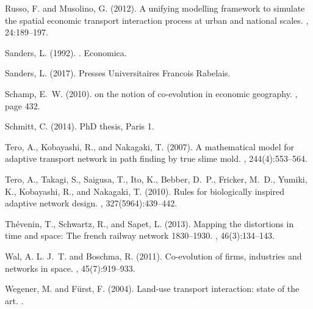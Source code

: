 \documentclass[11pt]{article}
\begin{document}
\begin{thebibliography}{}
Russo, F. and Musolino, G. (2012).
\newblock A unifying modelling framework to simulate the spatial economic
  transport interaction process at urban and national scales.
, 24:189--197.

Sanders, L. (1992).
.
\newblock Economica.

Sanders, L. (2017).
\newblock Presses Universitaires Francois Rabelais.

Schamp, E.~W. (2010).
 on the notion of co-evolution in economic geography.
, page 432.

Schmitt, C. (2014).
\newblock PhD thesis, Paris 1.

Tero, A., Kobayashi, R., and Nakagaki, T. (2007).
\newblock A mathematical model for adaptive transport network in path finding
  by true slime mold.
, 244(4):553--564.

Tero, A., Takagi, S., Saigusa, T., Ito, K., Bebber, D.~P., Fricker, M.~D.,
  Yumiki, K., Kobayashi, R., and Nakagaki, T. (2010).
\newblock Rules for biologically inspired adaptive network design.
, 327(5964):439--442.

Th{\'e}venin, T., Schwartz, R., and Sapet, L. (2013).
\newblock Mapping the distortions in time and space: The french railway network
  1830--1930.
, 46(3):134--143.

Wal, A. L. J.~T. and Boschma, R. (2011).
\newblock Co-evolution of firms, industries and networks in space.
, 45(7):919--933.

Wegener, M. and F{\"u}rst, F. (2004).
\newblock Land-use transport interaction: state of the art.
.


\end{thebibliography}
\end{document}
